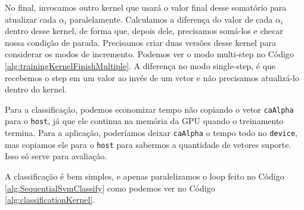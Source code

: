
No final, invocamos outro kernel que usará o valor final desse somatório para atualizar cada $\alpha_i$ paralelamente. Calculamos a diferença do valor de cada $\alpha_i$ dentro desse kernel, de forma que, depois dele, precisamos somá-los e checar nossa condição de parada. Precisamos criar duas versões desse kernel para considerar os modos de incremento. Podemos ver o modo multi-step no Código \ref{alg:trainingKernelFinishMultiple}. A diferença no modo single-step, é que recebemos o step em um valor ao invés de um vetor e não precisamos atualizá-lo dentro do kernel.


Para a classificação, podemos economizar tempo não copiando o vetor \texttt{caAlpha} para o \texttt{host}, já que ele continua na memória da GPU quando o treinamento termina. Para a aplicação, poderíamos deixar \texttt{caAlpha} o tempo todo no \texttt{device}, mas copiamos ele para o \texttt{host} para sabermos a quantidade de vetores suporte. Isso só serve para avaliação.

A classificação é bem simples, e apenas paralelizamos o loop feito no Código \ref{alg:SequentialSvmClassify} como podemos ver no Código \ref{alg:classificationKernel}.

